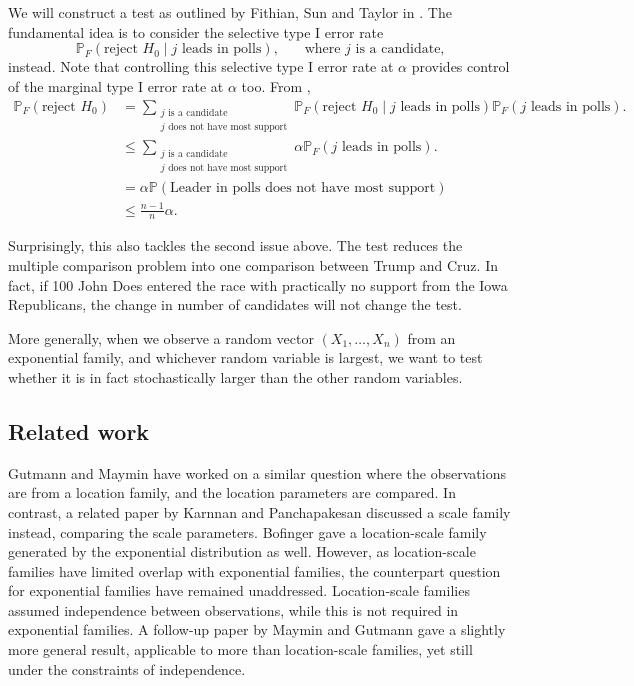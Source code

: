 \documentclass[11pt]{article}
\newcommand{\PP}{\mathbb{P}}
\begin{document}
We will construct a test as outlined by Fithian, Sun and Taylor in \cite{Fithian:2014ws}. The fundamental idea is to consider the selective type I error rate
$$\PP_F\left(\text{reject } H_0 \middle| j \text{ leads in polls} \right), ~~~~~~~~ \text{where $j$ is a candidate,}$$
instead. Note that controlling this selective type I error rate at $\alpha$ provides control of the marginal type I error rate at $\alpha$ too. From ,
\begin{align}
\PP_F\left(\text{reject } H_0\right) & = \sum_{\substack{j \text{ is a candidate} \\ j \text{ does not have most support}}} \PP_F\left(\text{reject } H_0 \middle| j \text{ leads in polls}\right) \PP_F \left(j \text{ leads in polls}\right). \nonumber \\
& \le \sum_{\substack{j \text{ is a candidate} \\ j \text{ does not have most support}}} \alpha \PP_F \left(j \text{ leads in polls}\right). \nonumber \\
& = \alpha \PP\left(\text{Leader in polls does not have most support}\right) \nonumber \\
& \le \frac{n-1}{n} \alpha. \label{eqn:selective_vs_marginal}
\end{align}

Surprisingly, this also tackles the second issue above. The test reduces the multiple comparison problem into one comparison between Trump and Cruz. In fact, if 100 John Does entered the race with practically no support from the Iowa Republicans, the change in number of candidates will not change the test.

More generally, when we observe a random vector $(X_1, \ldots, X_n)$ from an exponential family, and whichever random variable is largest, we want to test whether it is in fact stochastically larger than the other random variables.

\subsection{Related work}

Gutmann and Maymin \cite{Gutmann:1987fk} have worked on a similar question where the observations are from a location family, and the location parameters are compared. In contrast, a related paper by Karnnan and Panchapakesan \cite{Karnnan:2009iv} discussed a scale family instead, comparing the scale parameters. Bofinger \cite{Bofinger:1991hv} gave a location-scale family generated by the exponential distribution as well. However, as location-scale families have limited overlap with exponential families, the counterpart question for exponential families have remained unaddressed. Location-scale families assumed independence between observations, while this is not required in exponential families. A follow-up paper by Maymin and Gutmann \cite{Maymin:1992fz} gave a slightly more general result, applicable to more than location-scale families, yet still under the constraints of independence.
\end{document}
